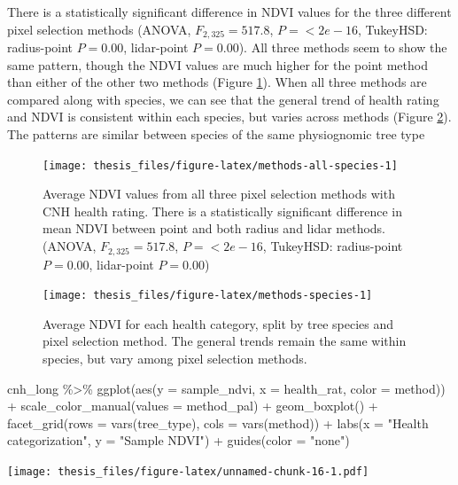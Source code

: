\documentclass[12pt,twoside]{reedthesis}
\newenvironment{Shaded}{\begin{snugshade}}{\end{snugshade}}
\newcommand{\AttributeTok}[1]{\textcolor[rgb]{0.77,0.63,0.00}{#1}}
\newcommand{\FunctionTok}[1]{\textcolor[rgb]{0.00,0.00,0.00}{#1}}
\newcommand{\NormalTok}[1]{#1}
\newcommand{\SpecialCharTok}[1]{\textcolor[rgb]{0.00,0.00,0.00}{#1}}
\newcommand{\StringTok}[1]{\textcolor[rgb]{0.31,0.60,0.02}{#1}}
\begin{document}
There is a statistically significant difference in NDVI values for the three different pixel selection methods (ANOVA, \(F_{2, 325}=517.8\), \(P = <2e-16\), TukeyHSD: radius-point \(P = 0.00\), lidar-point \(P = 0.00\)). All three methods seem to show the same pattern, though the NDVI values are much higher for the point method than either of the other two methods (Figure \ref{fig:methods-all-species}). When all three methods are compared along with species, we can see that the general trend of health rating and NDVI is consistent within each species, but varies across methods (Figure \ref{fig:methods-species}). The patterns are similar between species of the same physiognomic tree type
\begin{figure}
\texttt{[image: thesis\_files/figure-latex/methods-all-species-1]} \caption[NDVI and health rating comparison across methods]{Average NDVI values from all three pixel selection methods with CNH health rating. There is a statistically significant difference in mean NDVI between point and both radius and lidar methods. (ANOVA, $F_{2, 325}=517.8$, $P = <2e-16$, TukeyHSD: radius-point $P = 0.00$, lidar-point $P = 0.00$)}\label{fig:methods-all-species}
\end{figure}
\begin{figure}
\texttt{[image: thesis\_files/figure-latex/methods-species-1]} \caption[Average NDVI comparison between species and methods.]{Average NDVI for each health category, split by tree species and pixel selection method. The general trends remain the same within species, but vary among pixel selection methods.}\label{fig:methods-species}
\end{figure}
\begin{Shaded}
\begin{Highlighting}[]
\NormalTok{cnh\_long }\SpecialCharTok{\%\textgreater{}\%}
    \FunctionTok{ggplot}\NormalTok{(}\FunctionTok{aes}\NormalTok{(}\AttributeTok{y =}\NormalTok{ sample\_ndvi, }\AttributeTok{x =}\NormalTok{ health\_rat, }\AttributeTok{color =}\NormalTok{ method)) }\SpecialCharTok{+}
    \FunctionTok{scale\_color\_manual}\NormalTok{(}\AttributeTok{values =}\NormalTok{ method\_pal) }\SpecialCharTok{+} \FunctionTok{geom\_boxplot}\NormalTok{() }\SpecialCharTok{+}
    \FunctionTok{facet\_grid}\NormalTok{(}\AttributeTok{rows =} \FunctionTok{vars}\NormalTok{(tree\_type), }\AttributeTok{cols =} \FunctionTok{vars}\NormalTok{(method)) }\SpecialCharTok{+}
    \FunctionTok{labs}\NormalTok{(}\AttributeTok{x =} \StringTok{"Health categorization"}\NormalTok{, }\AttributeTok{y =} \StringTok{"Sample NDVI"}\NormalTok{) }\SpecialCharTok{+} \FunctionTok{guides}\NormalTok{(}\AttributeTok{color =} \StringTok{"none"}\NormalTok{)}
\end{Highlighting}
\end{Shaded}
\texttt{[image: thesis\_files/figure-latex/unnamed-chunk-16-1.pdf]}
\end{document}
